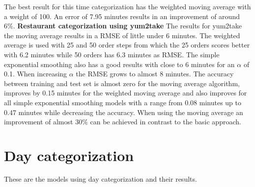 The best result for this time categorization has the weighted moving average with a weight of 100. An error of 7.95 minutes results in an improvement of around 6\%.
\newline\newline\textbf{Restaurant categorization using yum2take}\newline
The results for yum2take the moving average results in a RMSE of little under 6 minutes. The weighted average is used with 25 and 50 order steps from which the 25 orders scores better with 6.2 minutes while 50 orders has 6.3 minutes as RMSE. The simple exponential smoothing also has a good results with close to 6 minutes for an $\alpha$ of 0.1. When increasing $\alpha$ the RMSE grows to almost 8 minutes. The accuracy between training and test set is almost zero for the moving average algorithm, improves by 0.15 minutes for the weighted moving average and also improves for all simple exponential smoothing models with a range from 0.08 minutes up to 0.47 minutes while decreasing the accuracy.\newline
When using the moving average an improvement of almost 30\% can be achieved in contrast to the basic approach.
\section{Day categorization}\label{section:Day categorization}
These are the models using day categorization and their results.
